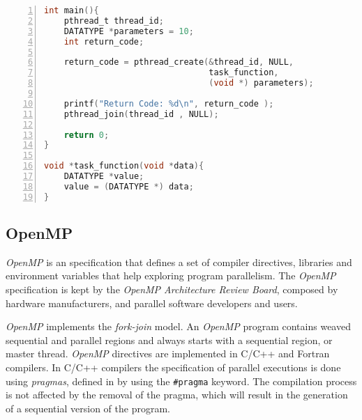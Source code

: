 \begin{lstlisting}[language=C, basicstyle=\ttfamily\scriptsize, numbers=left,
                   frame=no, showspaces=false, showstringspaces=false,
                   caption={\textit{Pthreads} Sample Program}, captionpos=b,
                   numberstyle=\tiny,
                   xleftmargin=0.5cm,
                   label=lst:listing-pthreads, keywords={%
                       DATATYPE, pthread_t, pthread_create,
                       pthread_join, task_function, NULL, int, main,
                       void, printf, return%
                       },
                   otherkeywords={::, \#pragma, \#include, <<<,>>>, \&, \*, +, -, /, [, ], >, <}
                   ]
int main(){
    pthread_t thread_id;
    DATATYPE *parameters = 10;
    int return_code;

    return_code = pthread_create(&thread_id, NULL,
                                 task_function,
                                 (void *) parameters);

    printf("Return Code: %d\n", return_code );
    pthread_join(thread_id , NULL);

    return 0;
}

void *task_function(void *data){
    DATATYPE *value;
    value = (DATATYPE *) data;
}
\end{lstlisting}

\subsection{OpenMP}

\textit{OpenMP} is an specification that defines a set of compiler directives,
libraries and environment variables that help exploring program parallelism.
The \textit{OpenMP} specification is kept by the \textit{OpenMP Architecture
Review Board}, composed by hardware manufacturers, and parallel software
developers and users.

\textit{OpenMP} implements the \textit{fork-join} model. An \textit{OpenMP}
program contains weaved sequential and parallel regions and always starts with
a sequential region, or master thread.  \textit{OpenMP} directives are
implemented in C/C++ and Fortran compilers. In C/C++ compilers the
specification of parallel executions is done using \textit{pragmas}, defined in
by using the \texttt{\#pragma} keyword.
The compilation process is not affected by the removal of the pragma,
which will result in the generation of a sequential version of the program.

